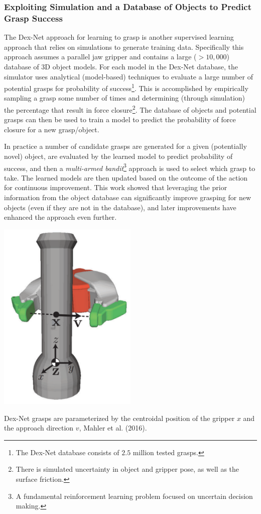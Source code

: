 \subsubsection{Exploiting Simulation and a Database of Objects to Predict Grasp Success\cite{MahlerPokornyEtAl2016}}
The Dex-Net approach for learning to grasp is another supervised learning approach that relies on simulations to generate training data. Specifically this approach assumes a parallel jaw gripper and contains a large ($>10,000$) database of 3D object models.
For each model in the Dex-Net database, the simulator uses analytical (model-based) techniques to evaluate a large number of potential grasps for probability of success\footnote{The Dex-Net database consists of $2.5$ million tested grasps.}. This is accomplished by empirically sampling a grasp some number of times and determining (through simulation) the percentage that result in force closure\footnote{There is simulated uncertainty in object and gripper pose, as well as the surface friction.}. The database of objects and potential grasps can then be used to train a model to predict the probability of force closure for a new grasp/object.

In practice a number of candidate grasps are generated for a given (potentially novel) object, are evaluated by the learned model to predict probability of success, and then a \textit{multi-armed bandit}\footnote[][-2\baselineskip]{A fundamental reinforcement learning problem focused on uncertain decision making.} approach is used to select which grasp to take. The learned models are then updated based on the outcome of the action for continuous improvement. This work showed that leveraging the prior information from the object database can significantly improve grasping for new objects (even if they are not in the database), and later improvements have enhanced the approach even further.
\begin{marginfigure}
\begin{center}
\includegraphics[width=0.5\textwidth]{tex/figs/ch26_figs/dexnet.png}
\caption{Dex-Net grasps are parameterized by the centroidal position of the gripper $x$ and the approach direction $v$, Mahler et al. (2016).}
\label{fig:dexnet}
\end{center}
\end{marginfigure}

